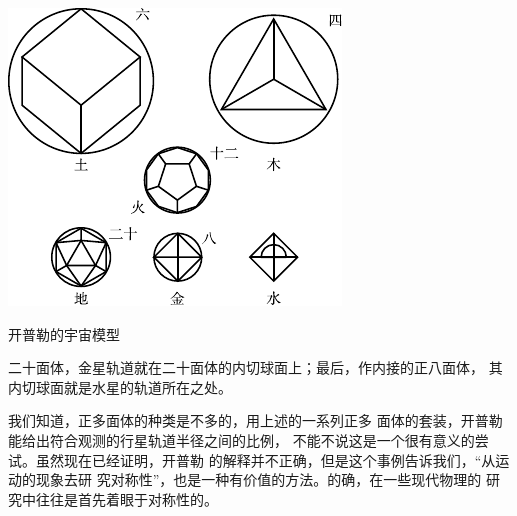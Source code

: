 \begin{figurex}
	\centering
	\includegraphics{figure/fig04.02b}
	\caption{开普勒的宇宙模型}
	\label{fig:04.02}
\end{figurex}

\noindent 二十面体，金星轨道就在二十面体的内切球面上；最后，作内接的正八面体，
其内切球面就是水星的轨道所在之处。

我们知道，正多面体的种类是不多的，用上述的一系列正多
面体的套装，开普勒能给出符合观测的行星轨道半径之间的比例，
不能不说这是一个很有意义的尝试。虽然现在已经证明，开普勒
的解释并不正确，但是这个事例告诉我们，“从运动的现象去研
究对称性”，也是一种有价值的方法。的确，在一些现代物理的
研究中往往是首先着眼于对称性的。

